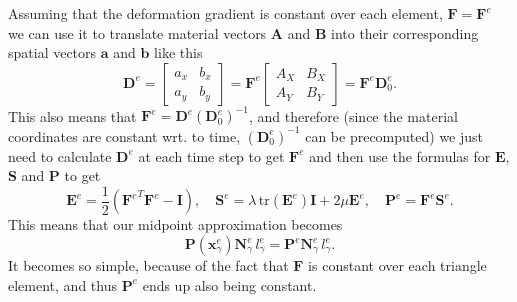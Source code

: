 \documentclass[acmtog]{acmart}
\begin{document}
Assuming that the deformation gradient is constant over each element, $\boldsymbol F = \boldsymbol F^e$ we can use it to translate material vectors $\boldsymbol A$ and $\boldsymbol B$ into their corresponding spatial vectors $\boldsymbol a$ and $\boldsymbol b$ like this
%
\begin{equation}
  \boldsymbol D^e = \begin{bmatrix}
    a_x & b_x \\
    a_y & b_y
  \end{bmatrix} = \boldsymbol F^e \begin{bmatrix}
    A_X & B_X \\
    A_Y & B_Y
  \end{bmatrix} = \boldsymbol F^e \boldsymbol D^e_0.
\end{equation}
%
This also means that $\boldsymbol F^e = \boldsymbol D^e (\boldsymbol D_0^e)^{-1}$, and therefore (since the material coordinates are constant wrt. to time, $( \boldsymbol D_0^e )^{-1}$ can be precomputed) we just need to calculate $\boldsymbol D^e$ at each time step to get $\boldsymbol F^e$ and then use the formulas for $\boldsymbol E$, $\boldsymbol S$ and $\boldsymbol P$ to get
%
\begin{equation}
  \boldsymbol E^e = \frac{1}{2} \left( {\boldsymbol F^e}^T \boldsymbol F^e - \boldsymbol I\right) , \quad \boldsymbol S^e = \lambda \, \mathrm{tr}(\boldsymbol E^e) \boldsymbol I + 2 \mu \boldsymbol E^e, \quad \boldsymbol P^e = \boldsymbol F^e \boldsymbol S^e.
\end{equation}
%
This means that our midpoint approximation becomes
%
\begin{equation}
  \boldsymbol P(\boldsymbol x_\gamma^e) \boldsymbol N_\gamma^e \, l_\gamma^e = \boldsymbol P^e \boldsymbol N_\gamma^e \, l_\gamma^e.
\end{equation}
%
It becomes so simple, because of the fact that $\boldsymbol F$ is constant over each triangle element, and thus $\boldsymbol P^e$ ends up also being constant.
\end{document}
